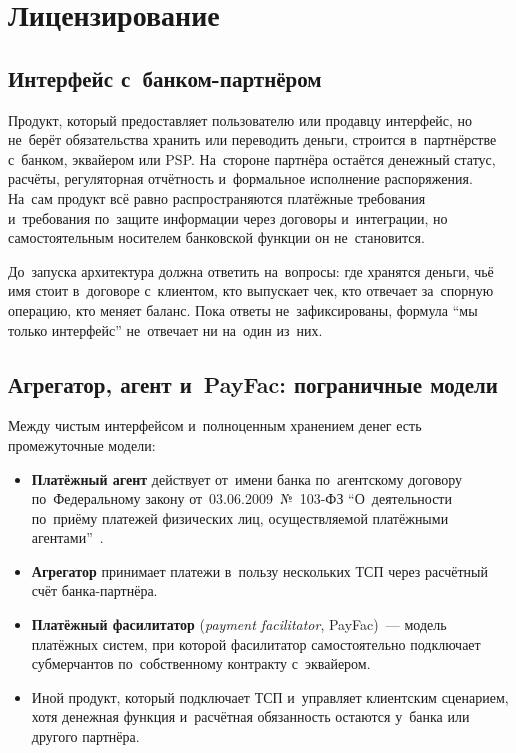 \section{Лицензирование}\label{sec:regulation-licensing}

\subsection*{Интерфейс с~банком-партнёром}

Продукт, который предоставляет пользователю или продавцу интерфейс, но не~берёт
обязательства хранить или переводить деньги, строится в~партнёрстве с~банком,
эквайером или PSP. На~стороне партнёра остаётся денежный статус, расчёты,
регуляторная отчётность и~формальное исполнение распоряжения. На~сам продукт
всё равно распространяются платёжные требования и~требования по~защите
информации через договоры и~интеграции, но самостоятельным носителем банковской
функции он не~становится.

До~запуска архитектура должна ответить на~вопросы: где хранятся деньги,
чьё имя стоит в~договоре с~клиентом, кто выпускает чек, кто отвечает за~спорную
операцию, кто меняет баланс. Пока ответы не~зафиксированы, формула \enquote{мы
только интерфейс} не~отвечает ни на~один из~них.

\subsection*{Агрегатор, агент и~PayFac: пограничные модели}

Между чистым интерфейсом и~полноценным хранением денег есть промежуточные
модели:

\begin{itemize}
  \item \textbf{Платёжный агент} действует от~имени банка по~агентскому
    договору по~Федеральному закону от~03.06.2009~№~103-ФЗ
    \enquote{О~деятельности по~приёму платежей физических лиц,
    осуществляемой платёжными агентами}~\cite{fz-103}.
  \item \textbf{Агрегатор} принимает платежи в~пользу нескольких ТСП через
    расчётный счёт банка-партнёра.
  \item \textbf{Платёжный фасилитатор} (\textit{payment facilitator}, PayFac)~--- модель
    платёжных систем, при которой фасилитатор самостоятельно подключает
    субмерчантов по~собственному контракту с~эквайером.
  \item Иной продукт, который подключает ТСП и~управляет клиентским сценарием,
    хотя денежная функция и~расчётная обязанность остаются у~банка или
    другого партнёра.
\end{itemize}

